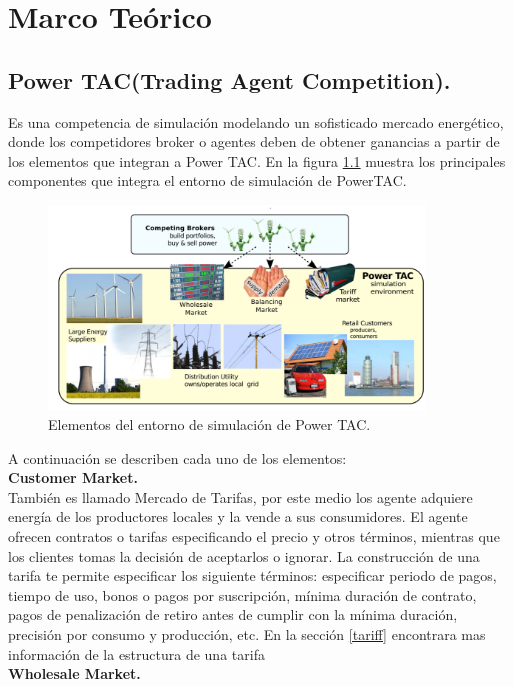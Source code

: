 \chapter{Marco Teórico}
\newpage
\section{Power TAC(Trading Agent Competition).}
Es una competencia de simulación modelando un sofisticado mercado energético, donde los competidores broker o agentes deben de obtener ganancias a partir de los elementos que integran a Power TAC. En la figura \ref{entorno} muestra los principales componentes que integra el entorno de simulación de PowerTAC.

\begin{figure}[!h]
    \centering
    \includegraphics[width=10cm]{img/entorno.png}
    \caption{Elementos del entorno de simulación de Power TAC.}
    \label{entorno}
\end{figure}

A continuación se describen cada uno de los elementos:\\

\textbf{Customer Market.}\\

También es llamado Mercado de Tarifas, por este medio los agente adquiere energía de los productores locales y la vende a sus consumidores. El agente ofrecen contratos o tarifas especificando el precio y otros términos, mientras que los clientes tomas la decisión de aceptarlos o ignorar. La construcción de una tarifa te permite especificar los siguiente términos: especificar periodo de pagos, tiempo de uso, bonos o pagos por suscripción, mínima duración de contrato, pagos de penalización de retiro antes de cumplir con la mínima duración, precisión por consumo y producción, etc. En la sección \ref{tariff} encontrara mas información de la estructura de una tarifa\\

\textbf{Wholesale Market.}\\

